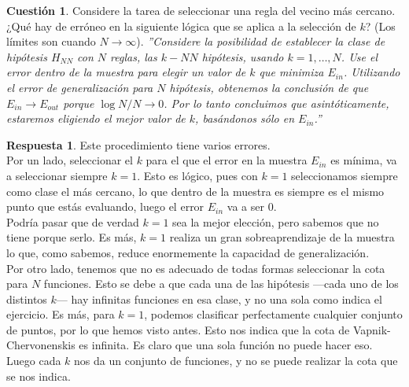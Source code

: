 \documentclass[10pt,a4paper]{article}
\theoremstyle{definition}
\newtheorem{cuestion}{Cuestión}
\newtheorem*{respuesta}{Respuesta}
\begin{document}
\begin{cuestion}
Considere la tarea de seleccionar una regla del vecino más cercano. ¿Qué hay de erróneo en la siguiente lógica que se aplica a la selección de $k$? (Los límites son cuando $N \rightarrow \infty$).
\textit{''Considere la posibilidad de establecer la clase de hipótesis $H_{NN}$ con $N$ reglas, las $k-NN$ hipótesis, usando $k =1,\dots,N$. Use el error dentro de la muestra para elegir un valor de $k$ que minimiza $E_{in}$. Utilizando el error de generalización para $N$ hipótesis, obtenemos la conclusión
de que $E_{in} \rightarrow E_{out}$ porque $\log N/N \rightarrow 0$. Por lo tanto concluimos que asintóticamente,
estaremos eligiendo el mejor valor de $k$, basándonos sólo en $E_{in}$.''}\\
\end{cuestion}
\begin{respuesta}
Este procedimiento tiene varios errores.\\

Por un lado, seleccionar el $k$ para el que el error en la muestra $E_{in}$ es mínima, va a seleccionar siempre $k=1$. Esto es lógico, pues con $k=1$ seleccionamos siempre como clase el más cercano, lo que dentro de la muestra es siempre es el mismo punto que estás evaluando, luego el error $E_{in}$ va a ser 0.\\

Podría pasar que de verdad $k=1$ sea la mejor elección, pero sabemos que no tiene porque serlo. Es más, $k=1$ realiza un gran sobreaprendizaje de la muestra lo que, como sabemos, reduce enormemente la capacidad de generalización.\\
  
Por otro lado, tenemos que no es adecuado de todas formas seleccionar la cota para $N$ funciones. Esto se debe a que cada una de las hipótesis ---cada uno de los distintos $k$--- hay infinitas funciones en esa clase, y no una sola como indica el ejercicio. Es más, para $k=1$, podemos clasificar perfectamente cualquier conjunto de puntos, por lo que hemos visto antes. Esto nos indica que la cota de Vapnik-Chervonenskis es infinita. Es claro que una sola función no puede hacer eso. Luego cada $k$ nos da un conjunto de funciones, y no se puede realizar la cota que se nos indica.\\
  
\end{respuesta}
\end{document}

